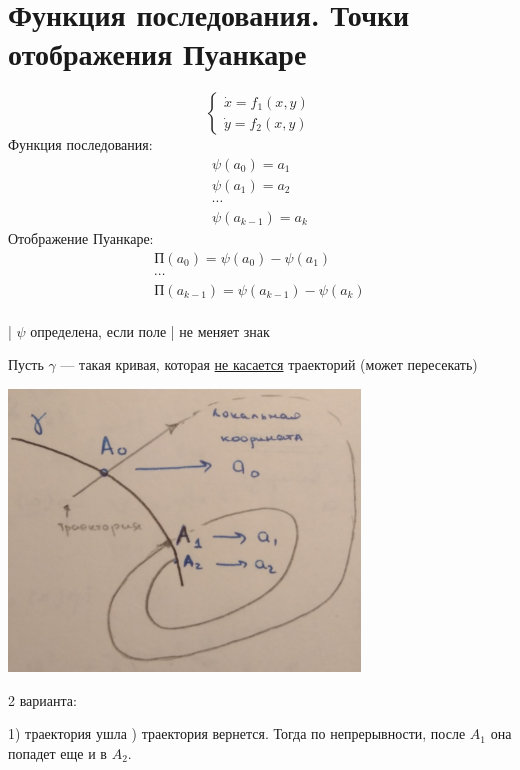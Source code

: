 
\section{Функция последования. Точки отображения Пуанкаре}

	\begin{minipage}{0.4\textwidth}	
		$$
			\begin{cases}
	 			\dot{x} = f_1(x,y) \\
	 			\dot{y} = f_2(x,y)
			\end{cases} 
		$$
		Функция последования:
		$$
			\begin{gathered}
				\psi(a_0) = a_1 \\
				\psi(a_1) = a_2 \\ \cdots \\
				\psi(a_{k-1}) = a_k			
			\end{gathered}
		$$
		Отображение Пуанкаре:
		\newline
		$$
			\begin{gathered}
				\text{П} (a_0) = \psi(a_0) - \psi(a_1) \\ \cdots \\
				\text{П} (a_{k-1}) = \psi(a_{k-1}) - \psi(a_k) \\ 	
			\end{gathered}
		$$ 
	
	    \begin{center}
				\Big| $\psi$ определена, если поле \Big| \newline не меняет знак
		\end{center}
	\end{minipage}
	\hfill
	\begin{minipage}{0.6\textwidth}
		Пусть $\gamma$ --- такая кривая, которая \newline 
		\underline{не касается} траекторий (может пересекать)	
		\begin{center} \includegraphics[width=0.7\textwidth]{ch8/pict/pict_1.png} \end{center} 
				\begin{center}2 варианта: \end{center}  
				1) траектория ушла ) траектория вернется. Тогда по непрерывности, \newline 
					после $A_1$ она попадет еще и в $A_2$.
	\end{minipage} \newline
